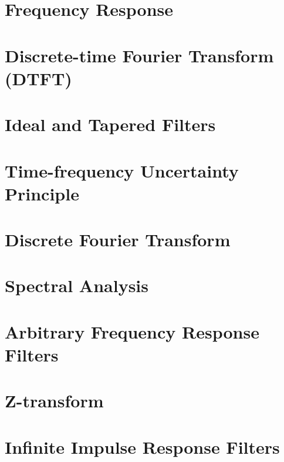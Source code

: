 \documentclass{tufte-book}
\begin{document}
\ifSpFResp
\chapter{Frequency Response}



\fi

\ifSpProgB

\fi

\ifSpDTFT
\chapter{Discrete-time Fourier Transform (DTFT)}



\fi

\ifSpFilters
\chapter{Ideal and Tapered Filters}



\fi

\ifSpUncertainty
\chapter{Time-frequency Uncertainty Principle}



\fi

\ifSpDFT
\chapter{Discrete Fourier Transform}



\fi

\ifSpSpectAn
\chapter{Spectral Analysis}



\fi

\ifSpFiltering
\chapter{Arbitrary Frequency Response Filters}



\fi

\ifSpProgC

\fi

\ifSpZFIR
\chapter{Z-transform}



\fi

\ifSpZIIR
\chapter{Infinite Impulse Response Filters}



\fi

\backmatter
\printindex
\end{document}
